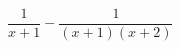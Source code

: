\hspace*{2mm}\begin{minipage}[t]{\dimexpr\linewidth-2mm\relax}\vspace{0pt}
$\dfrac{1}{x+1}-\dfrac{1}{(x+1)(x+2)}$\end{minipage}
